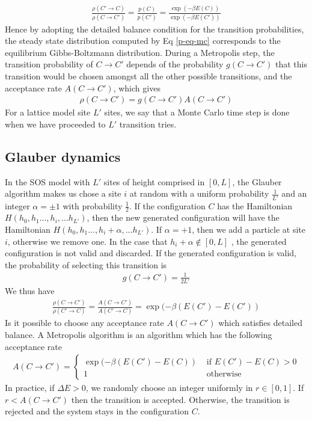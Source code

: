 \begin{align}
\frac{\rho(C'\to C)}{\rho(C \to C')} = \frac{p(C)}{p(C')} = \frac{\exp(-\beta E(C))}{\exp(-\beta E(C'))}
\end{align} 
Hence by adopting the detailed balance condition for the transition probabilities, the steady state distribution computed by Eq \eqref{p-eq-mc} corresponds to the equilibrium Gibbs-Boltzmann distribution. 
During a Metropolis step, the transition probability of $C\to C'$ depends of the probability $g(C\to C')$ that this transition would be chosen amongst all the other possible transitions, and the acceptance rate ${A(C \to C')}$, which gives
\begin{align}
    \rho(C\to C') = g(C\to C') A(C \to C')
    \label{acceptance-mc}
\end{align}
For a lattice model site $L'$ sites, we say that a Monte Carlo time step is done when we have proceeded to $L'$ transition tries.
\subsection{Glauber dynamics}

In the SOS model with $L'$ sites of height comprised in $[0,L]$, the Glauber algorithm \cite{glauber_timedependent_1963} makes us chose a site $i$ at random with a uniform probability $\frac{1}{L'}$ and an integer $\alpha = \pm 1$ with probability $\frac{1}{2}$. If the configuration $C$ has the Hamiltonian $H(h_0,h_1...,h_i,...h_{L'})$, then the new generated configuration will have the Hamiltonian $H(h_0,h_1...,h_i+\alpha,...h_{L'})$.
If $\alpha=+1$, then we add a particle at site $i$, otherwise we remove one. In the case that $h_i+\alpha \not\in [0,L]$ , the generated configuration is not valid and discarded.
If the generated configuration is valid, the probability of selecting this transition is
\begin{align}
g(C\to C') = \frac{1}{2L'}
\end{align}
We thus have
\begin{align}
\frac{\rho(C\to C')}{\rho(C' \to C)} = \frac{A(C\to C')}{A(C'\to C)} = \exp(-\beta (E(C')-E(C'))
\end{align}
Is it possible to choose any acceptance rate $A(C\to C')$ which satisfies detailed balance. A Metropolis algorithm is an algorithm which has the following acceptance rate
\begin{align}
A(C\to C') = \begin{cases} \exp(-\beta (E(C')-E(C)) &\text{ if } E(C')-E(C) \greater 0 \\
1 &\text{ otherwise} \end{cases}
\label{taux-transition-metropolis}
\end{align}
In practice, if $\Delta E \greater 0$, we randomly choose an integer uniformly in $r\in[0,1]$. If $r\less A(C\to C') $ then the transition is accepted. Otherwise, the transition is rejected and the system stays in the configuration $C$.


